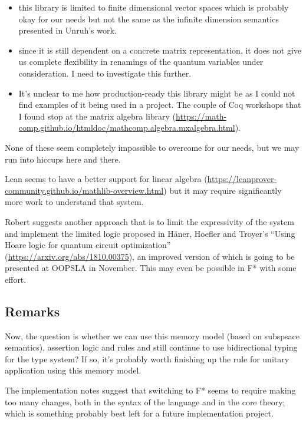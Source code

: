\documentclass[acmsmall,nonacm,timestamp,review=false,anonymous=false]{acmart}
\begin{document}
\begin{itemize}
	\item this library is limited to finite dimensional vector spaces which is probably okay for our needs but not the same as the infinite dimension semantics presented in Unruh's work.
	\item since it is still dependent on a concrete matrix representation, it does not give us complete flexibility in renamings of the quantum variables under consideration. I need to investigate this further.
	\item It's unclear to me how production-ready this library might be as I could not find examples of it being used in a project. The couple of Coq workshops that I found stop at the matrix algebra library (\url{https://math-comp.github.io/htmldoc/mathcomp.algebra.mxalgebra.html}).
\end{itemize}

None of these seem completely impossible to overcome for our needs, but we may run into hiccups here and there.

Lean seems to have a better support for linear algebra (\url{https://leanprover-community.github.io/mathlib-overview.html}) but it may require significantly more work to understand that system.

Robert suggests another approach that is to limit the expressivity of the system and implement the limited logic proposed in Häner, Hoefler and Troyer's ``Using Hoare logic for quantum circuit optimization'' (\url{https://arxiv.org/abs/1810.00375}), an improved version of which is going to be presented at OOPSLA in November. This may even be possible in F* with some effort.

\subsection{Remarks}
Now, the question is whether we can use this memory model (based on subspsace semantics), assertion logic and rules and still continue to use bidirectional typing for the type system? If so, it's probably worth finishing up the rule for unitary application using this memory model.

The implementation notes suggest that switching to F* seems to require making too many changes, both in the syntax of the language and in the core theory; which is something probably best left for a future implementation project.

\end{document}
